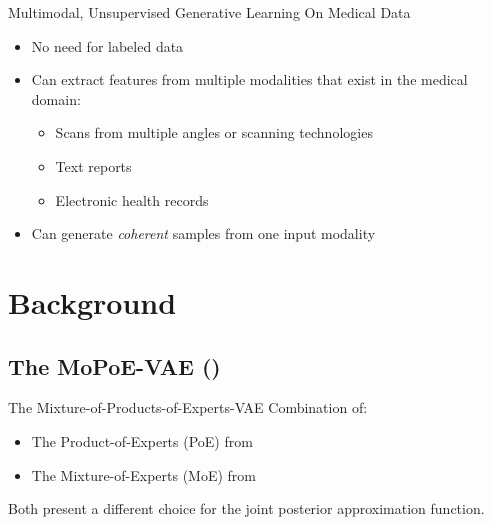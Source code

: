     
        \begin{frame}{Multimodal, Unsupervised Generative Learning On Medical Data}
        \begin{itemize}
            \item No need for labeled data
            \item Can extract features from multiple modalities that exist in the medical domain:
            \pause
                \begin{itemize}
                    \item Scans from multiple angles or scanning technologies
                    \item Text reports
                    \item Electronic health records
                \end{itemize}
            \pause
            \item Can generate \textit{coherent} samples from one input modality
        \end{itemize}
    \end{frame}
    
    \section{Background}

    \subsection{The MoPoE-VAE (\cite{thomas_gener-ELBO})}
    \begin{frame}{The Mixture-of-Products-of-Experts-VAE}
    \pause
        Combination of:
        \begin{itemize}
            \item The Product-of-Experts (PoE) from \cite{wu2018multimodal}
            \item The Mixture-of-Experts (MoE) from \cite{shi2019variational}
        \end{itemize}
        \vspace{\baselineskip}
        Both present a different choice for the joint posterior approximation function.
    \end{frame}
    
